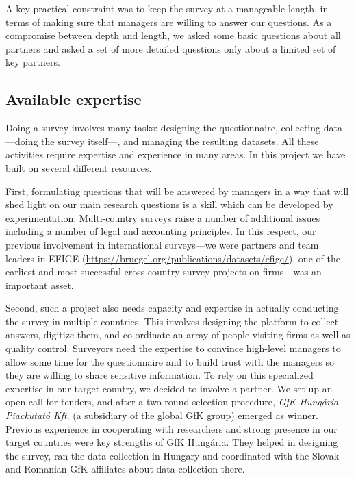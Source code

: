 \documentclass[final, dvipsnames, authoryear,12pt]{elsarticle}
\begin{document}
A key practical constraint was to keep the survey at a manageable length, in terms of making sure that managers are willing to answer our questions. As a compromise between depth and length, we asked some basic questions about all partners and asked a set of more detailed questions only about a limited set of key partners. 



\subsection{Available expertise}

Doing a survey involves many tasks: designing the questionnaire, collecting data---doing the survey itself---, and managing the resulting datasets. All these activities require expertise and experience in many areas. In this project we have built on several different resources.

First, formulating questions that will be answered by managers in a way that will shed light on our main research questions is a skill which can be developed by experimentation. Multi-country surveys raise a number of additional issues including a number of legal and accounting principles. In this respect, our previous involvement in international surveys---we were partners and team leaders in EFIGE (\url{https://bruegel.org/publications/datasets/efige/}), one of the earliest and most successful cross-country survey projects on firms---was an important asset. 

Second, such a project also needs capacity and expertise in actually conducting the survey in multiple countries. This involves designing the platform to collect answers, digitize them, and co-ordinate an array of people visiting firms as well as quality control. Surveyors need the expertise to convince high-level managers to allow some time for the questionnaire and to build trust with the managers so they are willing to share sensitive information. To rely on this specialized expertise in our target country, we decided to involve a partner. We set up an open call for tenders, and after a two-round selection procedure, \emph{GfK Hungária Piackutató Kft}. (a subsidiary of the global GfK group) emerged as winner. Previous experience in cooperating with researchers and strong presence in our target countries were key strengths of GfK Hungária. They helped in designing the survey, ran the data collection in Hungary and coordinated with the Slovak and Romanian GfK affiliates about data collection there.
\end{document}

